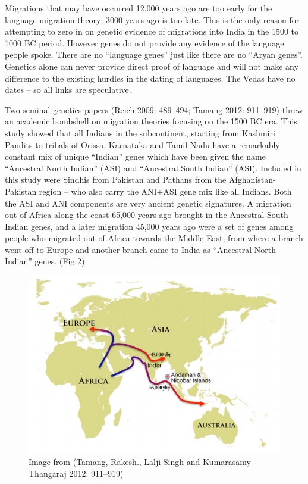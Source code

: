 Migrations that may have occurred 12,000 years ago are too early for the language migration theory; 3000 years ago is too late. This is the only reason for attempting to zero in on genetic evidence of migrations into India in the 1500 to 1000 BC period. However genes do not provide any evidence of the language people spoke. There are no “language genes” just like there are no “Aryan genes”. Genetics alone can never provide direct proof of language and will not make any difference to the existing hurdles in the dating of languages. The Vedas have no dates – so all links are speculative.

Two seminal genetics papers (Reich 2009: 489–494; Tamang 2012: 911–919) threw an academic bombshell on migration theories focusing on the 1500 BC era. This study showed that all Indians in the subcontinent, starting from Kashmiri Pandits to tribals of Orissa, Karnataka and Tamil Nadu have a remarkably constant mix of unique “Indian” genes which have been given the name “Ancestral North Indian” (ASI) and “Ancestral South Indian” (ASI). Included in this study were Sindhis from Pakistan and Pathans from the Afghanistan-Pakistan region – who also carry the ANI+ASI gene mix like all Indians. Both the ASI and ANI components are very ancient genetic signatures. A migration out of Africa along the coast 65,000 years ago brought in the Ancestral South Indian genes, and a later migration 45,000 years ago were a set of genes among people who migrated out of Africa towards the Middle East, from where a branch went off to Europe and another branch came to India as “Ancestral North Indian” genes. (Fig 2)

\begin{figure}[!htbp]
\includegraphics[scale=1.2]{images/7-02.jpg}
\caption{Image from (Tamang, Rakesh., Lalji Singh and Kumarasamy Thangaraj 2012: 911–919)}\label{art7-fig02}
\end{figure}

